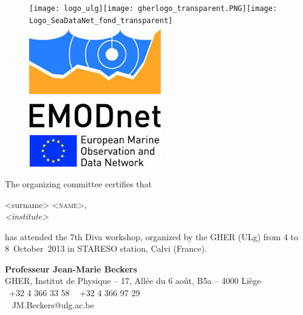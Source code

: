 \documentclass[12pt,a4paper]{article}
\begin{document}
 
\thispagestyle{empty}
\large

\begin{figure}
\centering
\texttt{[image: logo\_ulg]}\hspace*{.5cm}\texttt{[image: gherlogo\_transparent.PNG]}\hspace*{.5cm}\texttt{[image: Logo\_SeaDataNet\_fond\_transparent]}\hspace*{.5cm}\includegraphics[width=.07\paperwidth]{logo_emodnet}
\end{figure}


\vspace*{\fill}

 
The organizing committee certifies that

\vspace{1cm}

\begin{center}
\parbox{.8\textwidth}{
<surname> \textsc{<name>},\\
\textit{<institute>}
}
\end{center}

\vspace{1cm}

has attended the 7th \textsf{Diva} workshop, organized by the GHER (ULg) from 4 to 8~\mbox{October}~2013 in STARESO station, Calvi (France).


\vspace{\fill}


\vspace*{1cm}


\begin{center}
		\textbf{Professeur Jean-Marie Beckers}		\\
GHER, Institut de Physique -- 17, All\'{e}e du 6 ao\^{u}t,   B5a --  4000 Li\`{e}ge	 \\
	 \Telefon~+32 4 366 33 58 \hspace{.5cm}  \Faxmachine~ +32 4 366 97 29 \\
	  \Letter~ JM.Beckers@ulg.ac.be
\end{center}
\end{document}
